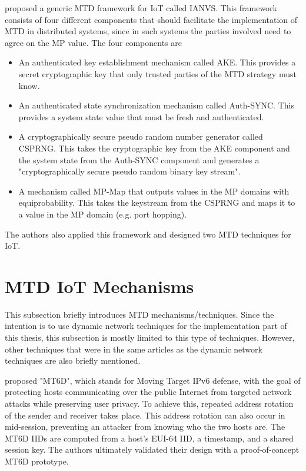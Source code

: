 \cite{NavasDefenseFramework} proposed a generic MTD framework for IoT called IANVS. This framework consists of four different components that should facilitate the implementation of MTD in distributed systems, since in such systems the parties involved need to agree on the MP value. The four components are

\begin{itemize}
    \item An authenticated key establishment mechanism called AKE. This provides a secret cryptographic key that only trusted parties of the MTD strategy must know.  
    \item An authenticated state synchronization mechanism called Auth-SYNC. This provides a system state value that must be fresh and authenticated. 
    \item A cryptographically secure pseudo random number generator called CSPRNG. This takes the cryptographic key from the AKE component and the system state from the Auth-SYNC component and generates a "cryptographically secure pseudo random binary key stream". 
    \item A mechanism called MP-Map that outputs values in the MP domains with equiprobability. This takes the keystream from the CSPRNG and maps it to a value in the MP domain (e.g. port hopping).
\end{itemize}

The authors also applied this framework and designed two MTD techniques for IoT.



\section{MTD IoT Mechanisms}
This subsection briefly introduces MTD mechanisms/techniques. Since the intention is to use dynamic network techniques for the implementation part of this thesis, this subsection is mostly limited to this type of techniques. However, other techniques that were in the same articles as the dynamic network techniques are also briefly mentioned. 

\cite{article:MT6D} proposed "MT6D", which stands for Moving Target IPv6 defense, with the goal of protecting hosts communicating over the public Internet from targeted network attacks while preserving user privacy. To achieve this, repeated address rotation of the sender and receiver takes place. This address rotation can also occur in mid-session, preventing an attacker from knowing who the two hosts are. The MT6D IIDs are computed from a host's EUI-64 IID, a timestamp, and a shared session key. The authors ultimately validated their design with a proof-of-concept MT6D prototype. 

